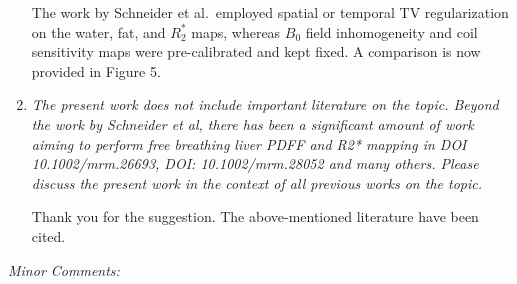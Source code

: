 \documentclass[a4paper,11pt]{report}
\begin{document}
\begin{enumerate}
\hspace{1em} The work by Schneider et al.~employed spatial or temporal TV regularization 
on the water, fat, and $R_2^*$ maps, whereas $B_0$ field inhomogeneity and 
coil sensitivity maps were pre-calibrated and kept fixed. A comparison is
now provided in Figure 5.

	\item \textit{The present work does not include important literature on the topic. Beyond the work by Schneider et al, there has been a significant amount of work aiming to perform free breathing liver PDFF and R2* mapping in DOI 10.1002/mrm.26693, DOI: 10.1002/mrm.28052 and many others. Please discuss the present work in the context of all previous works on the topic.}

\hspace{1em} Thank you for the suggestion. The above-mentioned literature have been cited.

\hspace{1em} 

\end{enumerate}

\noindent \textit{Minor Comments:}
\end{document}
